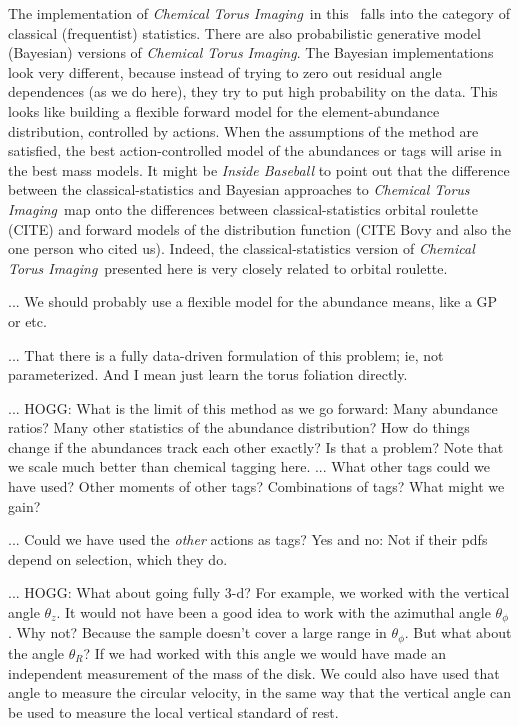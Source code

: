 \documentclass[modern]{aastex63}
\newcommand{\methodname}{\textsl{Chemical Torus Imaging}}
\begin{document}
The implementation of \methodname\ in this \documentname\ falls into the
category of classical (frequentist) statistics.
There are also probabilistic generative model (Bayesian) versions of \methodname.
The Bayesian implementations look very different, because instead of trying
to zero out residual angle dependences (as we do here), they try to put
high probability on the data.
This looks like building a flexible forward model for the element-abundance distribution,
controlled by actions.
When the assumptions of the method are satisfied,
the best action-controlled model of the abundances or tags will arise in the
best mass models.
It might be \textsl{Inside Baseball} to point out that the difference between
the classical-statistics and Bayesian approaches to \methodname\ map onto the
differences between classical-statistics orbital roulette (CITE) and forward
models of the distribution function (CITE Bovy and also the one person who cited us).
Indeed, the classical-statistics version of \methodname\ presented here is
very closely related to orbital roulette.

... We should probably use a flexible
model for the abundance means, like a GP or etc.

... That there is a fully data-driven formulation of this problem; ie, not
parameterized. And I mean just learn the torus foliation directly.

... HOGG: What is the limit of this method as we go forward: Many abundance ratios? Many other
statistics of the abundance distribution? How do things change if the abundances track
each other exactly? Is that a problem? Note that we scale much better than chemical tagging
here.
... What other tags could we have used? Other moments of other tags?
Combinations of tags? What might we gain?

... Could we have used the \emph{other} actions as tags? Yes and no: Not if
their pdfs depend on selection, which they do.

... HOGG: What about going fully 3-d?
For example, we worked with the vertical angle $\theta_z$. It
would not have been a good idea to work with the azimuthal angle
$\theta_\phi$. Why not? Because the sample doesn't cover a large range
in $\theta_\phi$. But what about the angle $\theta_R$? If we had
worked with this angle we would have made an independent measurement
of the mass of the disk. We could also have used that angle to measure
the circular velocity, in the same way that the vertical angle can be
used to measure the local vertical standard of rest.
\end{document}

